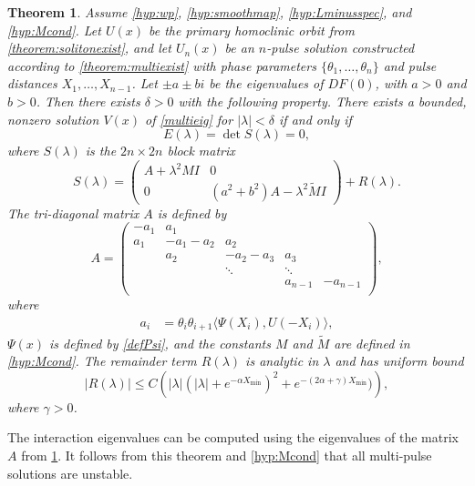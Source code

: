 \documentclass[12pt]{elsarticle}
\newtheorem{theorem}{Theorem}
\begin{document}
\begin{theorem}\label{th:blockmatrix}
Assume \cref{hyp:wp}, \cref{hyp:smoothmap}, \cref{hyp:Lminusspec}, and \cref{hyp:Mcond}. Let $U(x)$ be the primary homoclinic orbit from \cref{theorem:solitonexist}, and let $U_n(x)$ be an $n$-pulse solution constructed according to \cref{theorem:multiexist} with phase parameters $\{ \theta_1, \dots, \theta_n \}$ and pulse distances $X_1, \dots, X_{n-1}$. Let $\pm a \pm bi$ be the eigenvalues of $DF(0)$, with $a > 0$ and $b > 0$. Then there exists $\delta > 0$ with the following property. There exists a bounded, nonzero solution $V(x)$ of \cref{multieig} for $|\lambda| < \delta$ if and only if
\begin{equation}\label{blockmatrixcond}
E(\lambda) = \det S(\lambda) = 0,
\end{equation}
where $S(\lambda)$ is the $2n \times 2n$ block matrix
\begin{equation}\label{blockeq}
S(\lambda) = 
\begin{pmatrix}
A + \lambda^2 M I & 0 \\
0 & (a^2 + b^2) A - \lambda^2 \tilde{M} I
\end{pmatrix} + R(\lambda).
\end{equation}
The tri-diagonal matrix $A$ is defined by
\begin{equation*}
A = \begin{pmatrix}
-a_1 & a_1 \\
a_1 & -a_1 - a_2 &  a_2 \\
& a_2 & -a_2 - a_3 &  a_3 \\
& & \ddots & \ddots \\
& & &  a_{n-1} & -a_{n-1} \\
\end{pmatrix},
\end{equation*}
where
\begin{align*}
a_i &= \theta_i \theta_{i+1} \langle \Psi(X_i), U(-X_i) \rangle,
\end{align*}
$\Psi(x)$ is defined by \cref{defPsi}, and the constants $M$ and $\tilde{M}$ are defined in \cref{hyp:Mcond}. The remainder term $R(\lambda)$ is analytic in $\lambda$ and has uniform bound
\[
|R(\lambda)| \leq C\left( |\lambda|(|\lambda| + e^{-\alpha X_{\min}})^2 + e^{-(2 \alpha + \gamma)X_{\min} }) \right),
\]
where $\gamma > 0$.
\end{theorem}

The interaction eigenvalues can be computed using the eigenvalues of the matrix $A$ from \cref{th:blockmatrix}. It follows from this theorem and \cref{hyp:Mcond} that all multi-pulse solutions are unstable.
\end{document}
